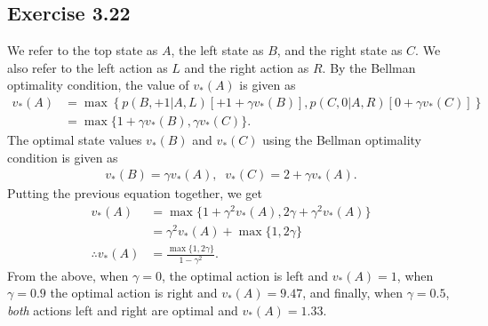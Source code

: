 \documentclass[10pt]{article}
\begin{document}
	 \subsection*{Exercise 3.22}
	 \label{ss:3.22}
	 We refer to the top state as $A$, the left state as $B$, and the right state as $C$. We also refer to the left action as $L$ and the right action as $R$. By the Bellman optimality condition, the value of $v_*(A)$ is given as
	 \begin{align*}
	 v_*(A) &= \max \left\{ p(B,+1|A,L)\left[ +1 + \gamma v_*(B)\right], p(C,0|A,R)\left[ 0+\gamma v_*(C)\right] \right\}\\&= \max\{ 1+\gamma v_*(B),\gamma v_*(C) \}.
	 \end{align*}
	 The optimal state values $v_*(B)$ and $v_*(C)$ using the Bellman optimality condition is given as
	 \begin{align*}
	 v_*(B) = \gamma v_*(A), \; \; v_*(C) = 2 + \gamma v_*(A).
	 \end{align*}
	 Putting the previous equation together, we get
	 \begin{align*}
	 v_*(A) &= \max\{ 1+\gamma^2v_*(A),2\gamma+\gamma^2v_*(A) \}\\
	 &= \gamma^2v_*(A) + \max \{ 1,2\gamma \}\\
	 \therefore v_*(A) &= \frac{\max\{1,2\gamma\}}{1-\gamma^2}.
	 \end{align*}
	 From the above, when $\gamma=0$, the optimal action is left and $v_*(A) = 1$, when $\gamma=0.9$ the optimal action is right and $v_*(A) = 9.47$, and finally, when $\gamma=0.5$, \emph{both} actions left and right are optimal and $v_*(A) = 1.33$.
\end{document}
